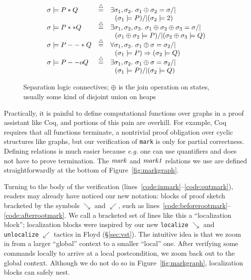 \documentclass[acmsmall,screen]{acmart}
\newcommand{\li}[1]{{\texttt{\small #1}}}
\newcommand{\defeq}{\mathbin{\stackrel{\triangle}{=}}}
\begin{document}
{\begin{figure}
\[
\begin{array}{lcl}
\sigma |= P * Q & \defeq & \exists \sigma_1, \sigma_2.~ \sigma_1 \oplus \sigma_2 = \sigma /| \null \\ && ~~ (\sigma_1 |= P) /| (\sigma_2 |= 2)\\
[-2pt]
\sigma |= P ** Q & \defeq & \exists \sigma_1, \sigma_2, \sigma_3.~ \sigma_1 \oplus \sigma_2 \oplus \sigma_3 = \sigma /| \null \\ && ~~ (\sigma_1 \oplus \sigma_2 |= P) /| (\sigma_2 \oplus \sigma_3 |= Q) \\
[-2pt]
\sigma |= P --* Q & \defeq & \forall \sigma_1, \sigma_2.~ \sigma_1 \oplus \sigma = \sigma_2 /| \null \\ && ~~
(\sigma_1 |= P) => (\sigma_2 |= Q) \\
[-2pt]
\sigma |= P --o Q & \defeq & \exists \sigma_1, \sigma_2.~ \sigma_1 \oplus \sigma = \sigma_2 /| \null \\ && ~~
(\sigma_1 |= P) /| (\sigma_2 |= Q)
\end{array}
\]
\vspace*{-1.5em}
\caption{Separation logic connectives; $\oplus$ is the join operation on states, usually some kind of disjoint union on heaps}
\label{fig:seplogsem}
\vspace*{-1em}
\end{figure}

Practically, it is painful to define computational functions over graphs in a proof assistant like Coq, and portions of this pain are overkill.  For example, Coq requires that all functions terminate, a nontrivial proof obligation over cyclic structures like graphs, but our verification of \li{mark} is only for partial correctness.  Defining relations is much easier because \emph{e.g.} one can use quantifiers and does not have to prove termination.
The $\mathit{mark}$ and $\mathit{mark1}$ relations we use are defined straightforwardly at the bottom of Figure~\ref{fig:markgraph}.

Turning to the body of the verification (lines~\ref{code:inmark}--\ref{code:outmark}), readers may already have noticed our new notation: blocks of proof sketch bracketed by the symbols $\searrow$ and $\swarrow$, such as lines~\ref{code:beforerootmark}--\ref{code:afterrootmark}.  We call a bracketed set of lines like this a ``localization block''; localization blocks were inspired by our new \li{localize} $\searrow$ and \li{unlocalize} $\swarrow$ tactics in Floyd (\S\ref{sec:vst}).
The intuitive idea is that we zoom in from a larger ``global'' context to a smaller ``local'' one.  After verifying some commands locally to arrive at a local postcondition, we zoom back out to the global context.  Although we do not do so in Figure~\ref{fig:markgraph}, localization blocks can safely nest.
}  
\end{document}
